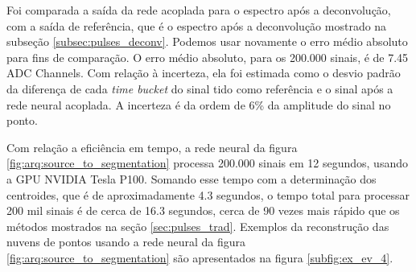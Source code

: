 \documentclass[a4paper,12pt,oneside]{book}
\begin{document}
\par Foi comparada a saída da rede acoplada para o espectro após a deconvolução, com a saída de referência, que é o espectro após a deconvolução mostrado na subseção \ref{subsec:pulses_deconv}. Podemos usar novamente o erro médio absoluto para fins de comparação. O erro médio absoluto, para os 200.000 sinais, é de 7.45 ADC Channels. Com relação à incerteza, ela foi estimada como o desvio padrão da diferença de cada \textit{time bucket} do sinal tido como referência e o sinal após a rede neural acoplada. A incerteza é da ordem de 6\% da amplitude do sinal no ponto.

\par Com relação a eficiência em tempo, a rede neural da figura \ref{fig:arq:source_to_segmentation} processa 200.000 sinais em 12 segundos, usando a GPU NVIDIA Tesla P100. Somando esse tempo com a determinação dos centroides, que é de aproximadamente 4.3 segundos, o tempo total para processar 200 mil sinais é de cerca de 16.3 segundos, cerca de 90 vezes mais rápido que os métodos mostrados na seção \ref{sec:pulses_trad}. Exemplos da reconstrução das nuvens de pontos usando a rede neural da figura \ref{fig:arq:source_to_segmentation} são apresentados na figura \ref{subfig:ex_ev_4}.
\end{document}
